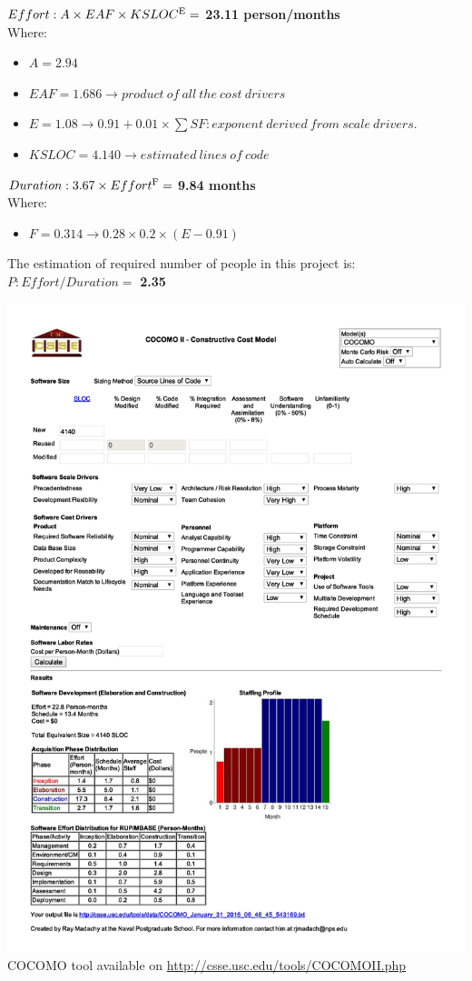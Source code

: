 $ Effort : A \times EAF \times KSLOC\textsuperscript{E} =$ \textbf{23.11 person/months}\\
Where:
\begin{itemize}
	\item $A = 2.94$
	\item $EAF = 1.686 \rightarrow product\ of\ all\ the\ cost\ drivers$
	\item $E = 1.08 \rightarrow 0.91 + 0.01 \times \sum SF : exponent\ derived\ from\ scale\ drivers. $
	\item $KSLOC = 4.140 \rightarrow estimated\ lines\ of\ code $
\end{itemize}
\vspace{10mm}
$ Duration : 3.67 \times Effort\textsuperscript{F} =$ \textbf{9.84 months}\\
Where:
\begin{itemize}
	\item $F = 0.314 \rightarrow 0.28 \times 0.2 \times (E - 0.91)$ 
\end{itemize}
\vspace{10mm}
The estimation of required number of people in this project is:\\
$P : Effort/Duration =$ \textbf{2.35} 

\begin{center}
	\includegraphics[width=\textwidth]{COCOMO/cocomo.jpg}
	COCOMO tool available on \url{http://csse.usc.edu/tools/COCOMOII.php}
\end{center}
